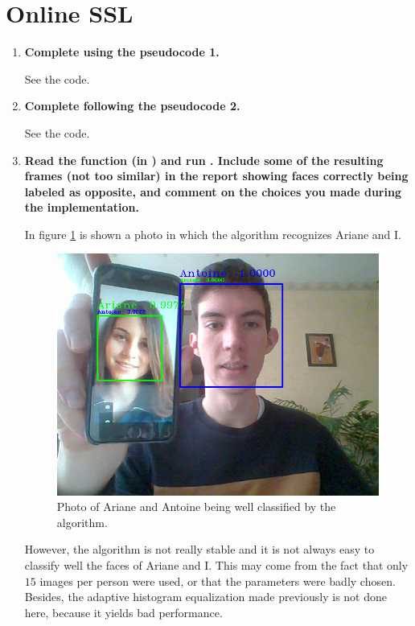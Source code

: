 \documentclass[a4paper, 11pt]{article}
\begin{document}
\pagebreak
\section{Online SSL}

\begin{enumerate}
	\item \textbf{Complete  using the pseudocode 1.}
    
    See the code.

	\item \textbf{Complete  following the pseudocode 2.}

    See the code.

	\item \textbf{Read the function  (in ) and run . Include some of the resulting frames (not too similar)
	in the report showing faces correctly being labeled as opposite, and comment on the choices you made during the implementation.}
	
	In figure \ref{fig:ariane-antoine} is shown a photo in which the algorithm recognizes Ariane and I.
	
	\begin{figure}[!h]
	    \centering
	    \includegraphics[width=.5\textwidth]{images/q33_ariane_antoine.png}
	    \caption{Photo of Ariane and Antoine being well classified by the algorithm.}
	    \label{fig:ariane-antoine}
	\end{figure}
	
	However, the algorithm is not really stable and it is not always easy to classify well the faces of Ariane and I. This may come from the fact that only $15$ images per person were used, or that the parameters were badly chosen. Besides, the adaptive histogram equalization made previously is not done here, because it yields bad performance.
	

\end{enumerate}
\end{document}
